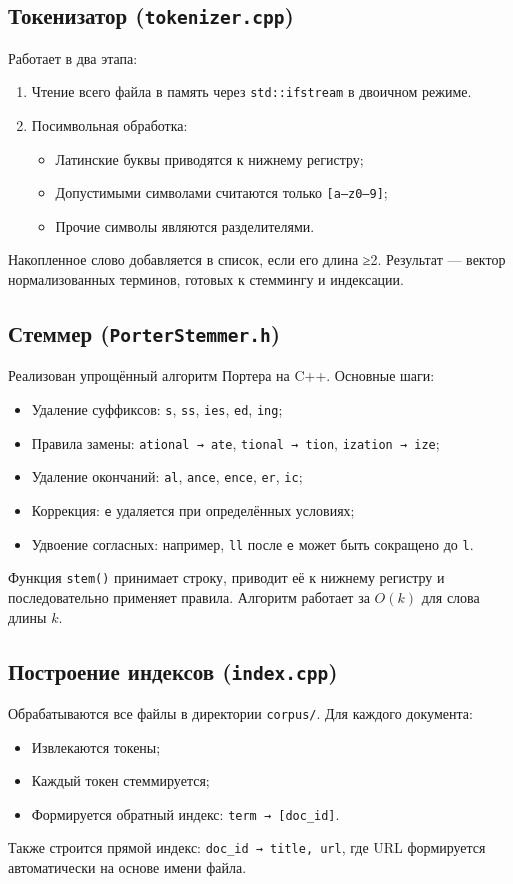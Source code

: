 \subsection*{Токенизатор (\texttt{tokenizer.cpp})}
Работает в два этапа:
\begin{enumerate}
\item Чтение всего файла в память через \texttt{std::ifstream} в двоичном режиме.
\item Посимвольная обработка:
\begin{itemize}
\item Латинские буквы приводятся к нижнему регистру;
\item Допустимыми символами считаются только \texttt{[a–z0–9]};
\item Прочие символы являются разделителями.
\end{itemize}
\end{enumerate}
Накопленное слово добавляется в список, если его длина ≥2. Результат — вектор нормализованных терминов, готовых к стеммингу и индексации.

\subsection*{Стеммер (\texttt{PorterStemmer.h})}
Реализован упрощённый алгоритм Портера на C++. Основные шаги:
\begin{itemize}
\item Удаление суффиксов: \texttt{s}, \texttt{ss}, \texttt{ies}, \texttt{ed}, \texttt{ing};
\item Правила замены: \texttt{ational → ate}, \texttt{tional → tion}, \texttt{ization → ize};
\item Удаление окончаний: \texttt{al}, \texttt{ance}, \texttt{ence}, \texttt{er}, \texttt{ic};
\item Коррекция: \texttt{e} удаляется при определённых условиях;
\item Удвоение согласных: например, \texttt{ll} после \texttt{e} может быть сокращено до \texttt{l}.
\end{itemize}
Функция \texttt{stem()} принимает строку, приводит её к нижнему регистру и последовательно применяет правила. Алгоритм работает за $O(k)$ для слова длины $k$.

\subsection*{Построение индексов (\texttt{index.cpp})}
Обрабатываются все файлы в директории \texttt{corpus/}. Для каждого документа:
\begin{itemize}
\item Извлекаются токены;
\item Каждый токен стеммируется;
\item Формируется обратный индекс: \texttt{term → [doc\_id]}.
\end{itemize}
Также строится прямой индекс: \texttt{doc\_id → title, url}, где URL формируется автоматически на основе имени файла.

